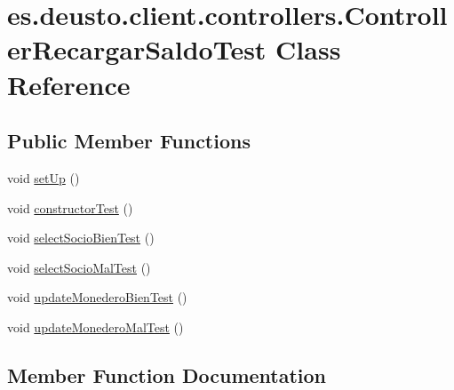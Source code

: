 \hypertarget{classes_1_1deusto_1_1client_1_1controllers_1_1_controller_recargar_saldo_test}{}\section{es.\+deusto.\+client.\+controllers.\+Controller\+Recargar\+Saldo\+Test Class Reference}
\label{classes_1_1deusto_1_1client_1_1controllers_1_1_controller_recargar_saldo_test}
\subsection*{Public Member Functions}
\begin{DoxyCompactItemize}
\item 
void \mbox{\hyperlink{classes_1_1deusto_1_1client_1_1controllers_1_1_controller_recargar_saldo_test_a057d5fa799e177897c168ea73a6fc266}{set\+Up}} ()
\item 
void \mbox{\hyperlink{classes_1_1deusto_1_1client_1_1controllers_1_1_controller_recargar_saldo_test_a1d877980fb9a6cbec483dc47f4bdec67}{constructor\+Test}} ()
\item 
void \mbox{\hyperlink{classes_1_1deusto_1_1client_1_1controllers_1_1_controller_recargar_saldo_test_a2079cf1ebb71eab0a9e8e91d9096f642}{select\+Socio\+Bien\+Test}} ()
\item 
void \mbox{\hyperlink{classes_1_1deusto_1_1client_1_1controllers_1_1_controller_recargar_saldo_test_a150feae944a368b5ccbd4f11fc05e267}{select\+Socio\+Mal\+Test}} ()
\item 
void \mbox{\hyperlink{classes_1_1deusto_1_1client_1_1controllers_1_1_controller_recargar_saldo_test_ae689db7d846bdf95b43dd55a391eac4b}{update\+Monedero\+Bien\+Test}} ()
\item 
void \mbox{\hyperlink{classes_1_1deusto_1_1client_1_1controllers_1_1_controller_recargar_saldo_test_a6c7a18a77ecc63cff76658f6071f0338}{update\+Monedero\+Mal\+Test}} ()
\end{DoxyCompactItemize}


\subsection{Member Function Documentation}
\mbox{\label{classes_1_1deusto_1_1client_1_1controllers_1_1_controller_recargar_saldo_test_a1d877980fb9a6cbec483dc47f4bdec67}} 
